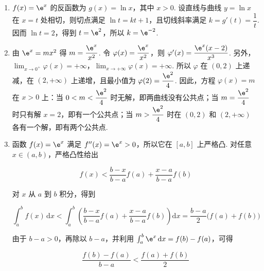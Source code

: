 \begin{solution}
\begin{enumerate}
\item \(f(x)=\e^x\) 的反函数为 \(g(x)=\ln x\)，其中 \(x>0\). 设直线与曲线 \(y=\ln x\) 在 \(x=t\) 处相切，则切点满足 \(\ln t=kt+1\)，且切线斜率满足 \(k=g'(t)=\dfrac1t\). 因而 \(\ln t=2\)，得到 \(t=\e^2\)，所以 \(k=\e^{-2}\).
\item 由 \(\e^x=mx^2\) 得 \(m=\dfrac{\e^x}{x^2}\). 令 \(\varphi(x)=\dfrac{\e^x}{x^2}\)，则 \(\varphi'(x)=\dfrac{\e^x(x-2)}{x^3}\). 另外，\(\displaystyle\lim_{x\to0^+}\varphi(x)=+\infty\)，\(\displaystyle\lim_{x\to+\infty}\varphi(x)=+\infty\). 所以 \(\varphi\) 在 \((0,2)\) 上递减，在 \((2,+\infty)\) 上递增，且最小值为 \(\varphi(2)=\dfrac{\e^2}{4}\). 因此，方程 \(\varphi(x)=m\) 在 \(x>0\) 上：当 \(0<m<\dfrac{\e^2}{4}\) 时无解，即两曲线没有公共点；当 \(m=\dfrac{\e^2}{4}\) 时只有解 \(x=2\)，即有一个公共点；当 \(m>\dfrac{\e^2}{4}\) 时在 \((0,2)\) 和 \((2,+\infty)\) 各有一个解，即有两个公共点.
\item 函数 \(f(x)=\e^x\) 满足 \(f''(x)=\e^x>0\)，所以它在 \([a,b]\) 上严格凸. 对任意 \(x\in(a,b)\)，严格凸性给出

\[
f(x)<\dfrac{b-x}{b-a}f(a)+\dfrac{x-a}{b-a}f(b)
\]

对 \(x\) 从 \(a\) 到 \(b\) 积分，得到

\[
\int_a^b f(x)\,\mathrm dx
<\int_a^b\left(\dfrac{b-x}{b-a}f(a)+\dfrac{x-a}{b-a}f(b)\right)\mathrm dx
=\dfrac{b-a}{2}\bigl(f(a)+f(b)\bigr)
\]

由于 \(b-a>0\)，再除以 \(b-a\)，并利用 \(\int_a^b \e^x\,\mathrm dx=f(b)-f(a)\)，可得

\[
\dfrac{f(b)-f(a)}{b-a}<\dfrac{f(a)+f(b)}2
\]
\end{enumerate}
\end{solution}
